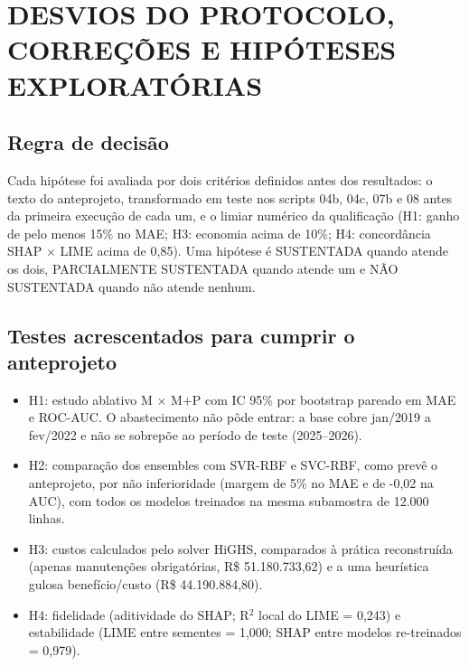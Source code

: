 
\chapter{DESVIOS DO PROTOCOLO, CORREÇÕES E HIPÓTESES EXPLORATÓRIAS}
\label{ap:desvios}

\section{Regra de decisão}
Cada hipótese foi avaliada por dois critérios definidos antes dos resultados: o texto do anteprojeto, transformado em teste nos scripts 04b, 04c, 07b e 08 antes da primeira execução de cada um, e o limiar numérico da qualificação (H1: ganho de pelo menos 15\% no MAE; H3: economia acima de 10\%; H4: concordância SHAP $\times$ LIME acima de 0,85). Uma hipótese é SUSTENTADA quando atende os dois, PARCIALMENTE SUSTENTADA quando atende um e NÃO SUSTENTADA quando não atende nenhum.

\section{Testes acrescentados para cumprir o anteprojeto}
\begin{itemize}
\item H1: estudo ablativo M $\times$ M+P com IC 95\% por bootstrap pareado em MAE e ROC-AUC. O abastecimento não pôde entrar: a base cobre jan/2019 a fev/2022 e não se sobrepõe ao período de teste (2025–2026).
\item H2: comparação dos ensembles com SVR-RBF e SVC-RBF, como prevê o anteprojeto, por não inferioridade (margem de 5\% no MAE e de -0,02 na AUC), com todos os modelos treinados na mesma subamostra de 12.000 linhas.
\item H3: custos calculados pelo solver HiGHS, comparados à prática reconstruída (apenas manutenções obrigatórias, R\$ 51.180.733,62) e a uma heurística gulosa benefício/custo (R\$ 44.190.884,80).
\item H4: fidelidade (aditividade do SHAP; R$^2$ local do LIME = 0,243) e estabilidade (LIME entre sementes = 1,000; SHAP entre modelos re-treinados = 0,979).
\end{itemize}

